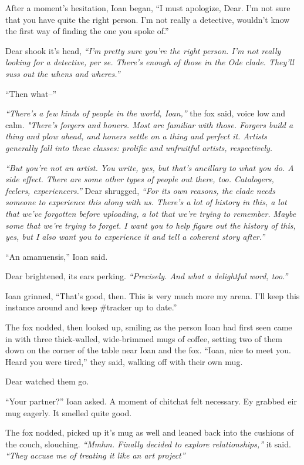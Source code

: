 After a moment's hesitation, Ioan began, ``I must apologize, Dear. I'm not sure that you have quite the right person. I'm not really a detective, wouldn't know the first way of finding the one you spoke of.''

Dear shook it's head, \emph{``I'm pretty sure you're the right person. I'm not really looking for a detective, per se. There's enough of those in the Ode clade. They'll suss out the whens and wheres.''}

``Then what--''

\emph{``There's a few kinds of people in the world, Ioan,''} the fox said, voice low and calm. \emph{"There's forgers and honers. Most are familiar with those. Forgers build a thing and plow ahead, and honers settle on a thing and perfect it. Artists generally fall into these classes: prolific and unfruitful artists, respectively.}

\emph{``But you're not an artist. You write, yes, but that's ancillary to what you do. A side effect. There are some other types of people out there, too. Catalogers, feelers, experiencers.''} Dear shrugged, \emph{``For its own reasons, the clade needs someone to experience this along with us. There's a lot of history in this, a lot that we've forgotten before uploading, a lot that we're trying to remember. Maybe some that we're trying to forget. I want you to help figure out the history of this, yes, but I also want you to experience it and tell a coherent story after.''}

``An amanuensis,'' Ioan said.

Dear brightened, its ears perking. \emph{``Precisely. And what a delightful word, too.''}

Ioan grinned, ``That's good, then. This is very much more my arena. I'll keep this instance around and keep \#tracker up to date.''

The fox nodded, then looked up, smiling as the person Ioan had first seen came in with three thick-walled, wide-brimmed mugs of coffee, setting two of them down on the corner of the table near Ioan and the fox. ``Ioan, nice to meet you. Heard you were tired,'' they said, walking off with their own mug.

Dear watched them go.

``Your partner?'' Ioan asked. A moment of chitchat felt necessary. Ey grabbed eir mug eagerly. It smelled quite good.

The fox nodded, picked up it's mug as well and leaned back into the cushions of the couch, slouching. \emph{``Mmhm. Finally decided to explore relationships,''} it said. \emph{``They accuse me of treating it like an art project''}

